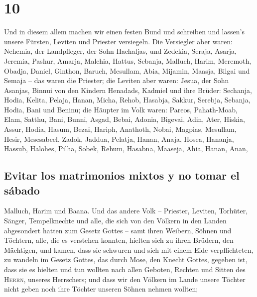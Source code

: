 \hypertarget{section-9}{%
\section{10}\label{section-9}}

 Und in diesem allem machen wir einen festen Bund und
schreiben und lassen's unsere Fürsten, Leviten und Priester versiegeln.
 Die Versiegler aber waren: Nehemia, der Landpfleger, der
Sohn Hachaljas, und Zedekia,  Seraja, Asarja, Jeremia,
 Pashur, Amarja, Malchia,  Hattus, Sebanja,
Malluch,  Harim, Meremoth, Obadja,  Daniel,
Ginthon, Baruch,  Mesullam, Abia, Mijamin, 
Maasja, Bilgai und Semaja -- das waren die Priester;  die
Leviten aber waren: Jesua, der Sohn Asanjas, Binnui von den Kindern
Henadads, Kadmiel  und ihre Brüder: Sechanja, Hodia,
Kelita, Pelaja, Hanan,  Micha, Rehob, Hasabja,
 Sakkur, Serebja, Sebanja,  Hodia, Bani
und Beninu;  die Häupter im Volk waren: Pareos,
Pahath-Moab, Elam, Satthu, Bani,  Bunni, Asgad, Bebai,
 Adonia, Bigevai, Adin,  Ater, Hiskia,
Assur,  Hodia, Hasum, Bezai,  Hariph,
Anathoth, Nobai,  Magpias, Mesullam, Hesir,
 Mesesabeel, Zadok, Jaddua,  Pelatja,
Hanan, Anaja,  Hosea, Hananja, Hassub, 
Halohes, Pilha, Sobek,  Rehum, Hasabna, Maaseja,
 Ahia, Hanan, Anan,

\hypertarget{evitar-los-matrimonios-mixtos-y-no-tomar-el-suxe1bado}{%
\subsection{Evitar los matrimonios mixtos y no tomar el
sábado}\label{evitar-los-matrimonios-mixtos-y-no-tomar-el-suxe1bado}}

 Malluch, Harim und Baana.  Und das andere
Volk -- Priester, Leviten, Torhüter, Sänger, Tempelknechte und alle, die
sich von den Völkern in den Landen abgesondert hatten zum Gesetz Gottes
-- samt ihren Weibern, Söhnen und Töchtern, alle, die es verstehen
konnten,  hielten sich zu ihren Brüdern, den Mächtigen,
und kamen, dass sie schwuren und sich mit einem Eide verpflichteten, zu
wandeln im Gesetz Gottes, das durch Mose, den Knecht Gottes, gegeben
ist, dass sie es hielten und tun wollten nach allen Geboten, Rechten und
Sitten des \textsc{Herrn}, unseres Herrschers;  und dass
wir den Völkern im Lande unsere Töchter nicht geben noch ihre Töchter
unseren Söhnen nehmen wollten;


